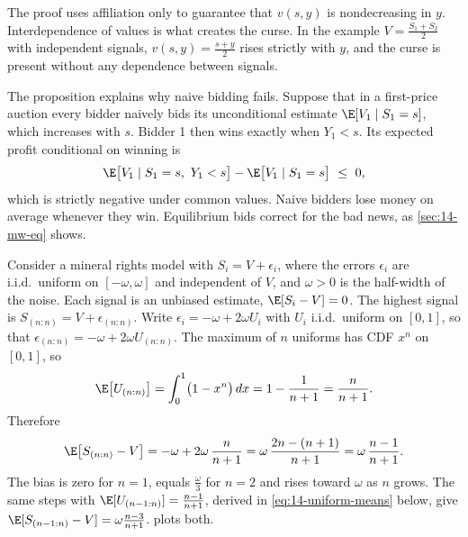 The proof uses affiliation only to guarantee that $v(s,y)$ is nondecreasing in $y$. Interdependence of
values is what creates the curse. In the example $V=\frac{S_1+S_2}{2}$ with independent signals,
$v(s,y)=\frac{s+y}{2}$ rises strictly with $y$, and the curse is present without any dependence between
signals.

The proposition explains why naive bidding fails. Suppose that in a first-price auction every bidder
naively bids its unconditional estimate $\E[V_1\mid S_1=s]$, which increases with $s$. Bidder 1 then wins
exactly when $Y_1<s$. Its expected profit conditional on winning is
\[
\E\bigl[V_1\mid S_1=s,\ Y_1<s\bigr]-\E\bigl[V_1\mid S_1=s\bigr]\ \le\ 0,
\]
which is strictly negative under common values. Naive bidders lose money on average whenever they win.
Equilibrium bids correct for the bad news, as \cref{sec:14-mw-eq} shows.

\begin{example}\label{ex:14-wc-uniform}
Consider a mineral rights model with $S_i=V+\epsilon_i$, where the errors $\epsilon_i$ are i.i.d.\ uniform on
$[-\omega,\omega]$ and independent of $V$, and $\omega>0$ is the half-width of the noise. Each signal is an
unbiased estimate, $\E[S_i-V]=0$. The highest signal is $S_{(n:n)}=V+\epsilon_{(n:n)}$. Write
$\epsilon_i=-\omega+2\omega U_i$ with $U_i$ i.i.d.\ uniform on $[0,1]$, so that
$\epsilon_{(n:n)}=-\omega+2\omega U_{(n:n)}$. The maximum of $n$ uniforms has CDF $x^n$ on $[0,1]$, so
\[
\E\bigl[U_{(n:n)}\bigr]=\int_0^1\bigl(1-x^n\bigr)\,dx=1-\frac{1}{n+1}=\frac{n}{n+1}.
\]
Therefore
\begin{equation}\label{eq:14-wc-bias}
\E\bigl[S_{(n:n)}-V\bigr]=-\omega+2\omega\,\frac{n}{n+1}=\omega\,\frac{2n-(n+1)}{n+1}=\omega\,\frac{n-1}{n+1}.
\end{equation}
The bias is zero for $n=1$, equals $\frac{\omega}{3}$ for $n=2$ and rises toward $\omega$ as $n$ grows. The
same steps with $\E[U_{(n-1:n)}]=\frac{n-1}{n+1}$, derived in \eqref{eq:14-uniform-means} below, give
$\E[S_{(n-1:n)}-V]=\omega\frac{n-3}{n+1}$.  plots both.
\end{example}

